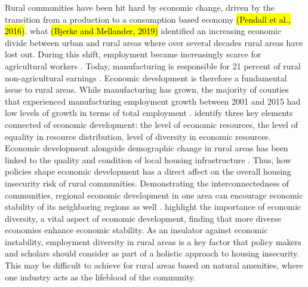 Rural communities have been hit hard by economic change, driven by the transition from a production to a consumption based economy \hl{(Pendall et al., 2016)}. what \hl{(Bjerke and Mellander, 2019)} identified an increasing economic divide between urban and rural areas where over several decades rural areas have lost out. During this shift, employment became increasingly scarce for agricultural workers \citep{kropczynski_insights_2012}. Today, manufacturing is responsible for 21 percent of rural non-agricultural earnings \citep{low_rural_2017}. Economic development is therefore a fundamental issue to rural areas. While manufacturing has grown, the majority of counties that experienced manufacturing employment growth between 2001 and 2015 had low levels of growth in terms of total employment \citep{low_rural_2017}. \citet{sherrieb_measuring_2010} identify three key elements connected of economic development: the level of economic resources, the level of equality in resource distribution, level of diversity in economic resources. Economic development alongside demographic change in rural areas has been linked to the quality and condition of local housing infrastructure \citep{barcus_heterogeneity_2011}. Thus, how policies shape economic development has a direct affect on the overall housing insecurity risk of rural communities. Demonstrating the interconnectedness of communities, regional economic development in one area can encourage economic stability of its neighboring regions as well \citep{chen_economic_2018}. \citet{deller_spatial_2016} highlight the importance of economic diversity, a vital aspect of economic development, finding that more diverse economies enhance economic stability. As an insulator against economic instability, employment diversity in rural areas is a key factor that policy makers and scholars should consider as part of a holistic approach to housing insecurity. This may be difficult to achieve for rural areas based on natural amenities, where one industry acts as the lifeblood of the community. 

 

